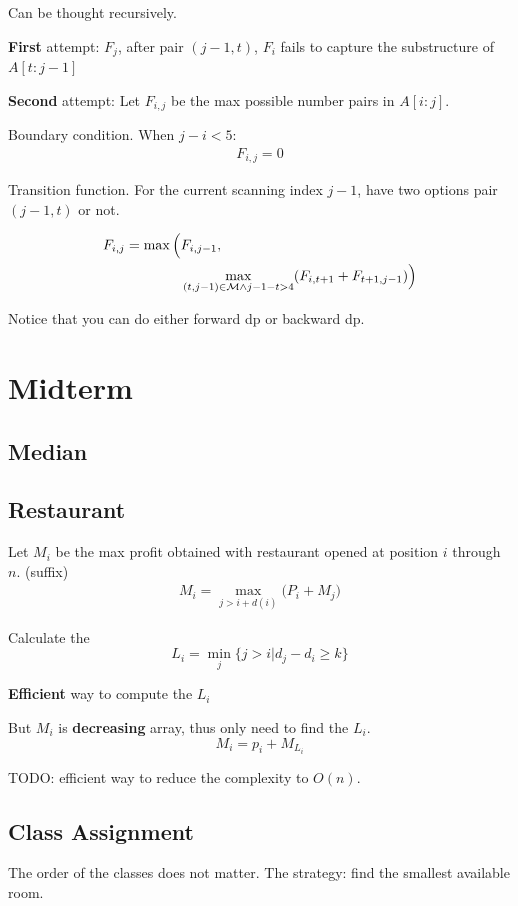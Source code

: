 \documentclass[a4paper]{report}
\theoremstyle{definition}
\begin{document}
Can be thought recursively.

\textbf{First} attempt: $F_j$, after pair $(j-1, t)$, $F_i$ fails to capture the substructure of $A[t:j-1]$

\textbf{Second} attempt: Let $F_{i,j}$ be the max possible number pairs in $A[i:j]$.

Boundary condition. When $j-i<5$:
\begin{align*}
F_{i, j} = 0
\end{align*}

Transition function. For the current scanning index $j-1$, have two options pair $(j-1, t)$ or not.

\begin{align*}
F_{i, j} = \max\Big(&F_{i, j-1}, \\
& \max_{(t, j-1) \in \mathcal{M} \wedge j-1-t>4} (F_{i, t+1}+F_{t+1, j-1})\Big)
\end{align*}

Notice that you can do either forward dp or backward dp.

\section{Midterm}
\subsection{Median}
\subsection{Restaurant}
Let $M_i$ be the max profit obtained with restaurant opened at position $i$ through $n$. (suffix)
\begin{align*}
M_i = \max_{j>i+d(i)} \Big(P_i + M_j\Big)
\end{align*}

Calculate the
$$L_i=\min_j\{j>i|d_j - d_i \geq k\}$$

\textbf{Efficient} way to compute the $L_i$

But $M_i$ is \textbf{decreasing} array, thus only need to find the $L_i$.
$$
M_i = p_i + M_{L_i}
$$

TODO: efficient way to reduce the complexity to $O(n)$.
\subsection{Class Assignment}
The order of the classes does not matter. The strategy: find the smallest available room.
\end{document}
